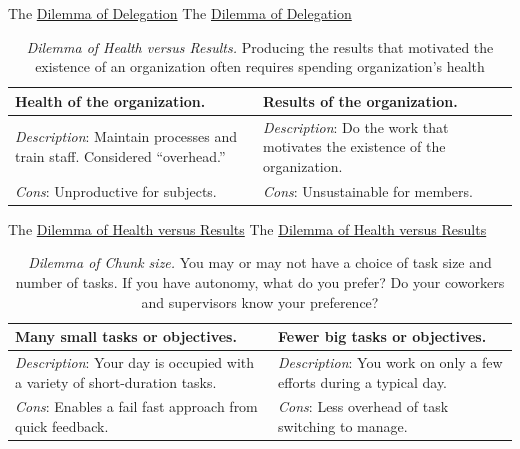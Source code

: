 The \href{table:delegate-or-not}{Dilemma of Delegation}
The \href{table:delegate-or-not}{Dilemma of Delegation}


\begin{center}
\begin{table}[H] %
\begin{tabular}{ | m{\dilemmatablewidth}| m{\dilemmatablewidth} | } 
  \hline
  \textbf{Health of the organization.} & 
  \textbf{Results of the organization.} \\ 
  \hline
  \textit{Description}: Maintain processes and train staff. Considered ``overhead.'' & 
  \textit{Description}: Do the work that motivates the existence of the organization. \\  
    \hline
  \textit{Cons}: Unproductive for subjects. & 
  \textit{Cons}: Unsustainable for members. \\
  \hline
\end{tabular}
\caption{
\textit{Dilemma of Health versus Results.}
 Producing the results that motivated the existence of an organization often requires spending organization's health
}
\label{table:health-vs-results}
\end{table}
\end{center}

The \href{table:health-vs-results}{Dilemma of Health versus Results}
The \href{table:health-vs-results}{Dilemma of Health versus Results}

\begin{center}
\begin{table}[H] %
\begin{tabular}{ | m{\dilemmatablewidth}| m{\dilemmatablewidth} | } 
  \hline
  \textbf{Many small tasks or objectives.} & 
  \textbf{Fewer big tasks or objectives.} \\ 
  \hline
  \textit{Description}: Your day is occupied with a variety of short-duration tasks. & 
  \textit{Description}: You work on only a few efforts during a typical day. \\  
    \hline
  \textit{Cons}: Enables a fail fast approach from quick feedback. & 
  \textit{Cons}: Less overhead of task switching to manage. \\
  \hline
\end{tabular}
\caption{
\textit{Dilemma of Chunk size.}
You may or may not have a choice of task size and number of tasks. If you have autonomy, what do you prefer? Do your coworkers and supervisors know your preference? 
}
\label{table:chunk_size}
\end{table}
\end{center}


